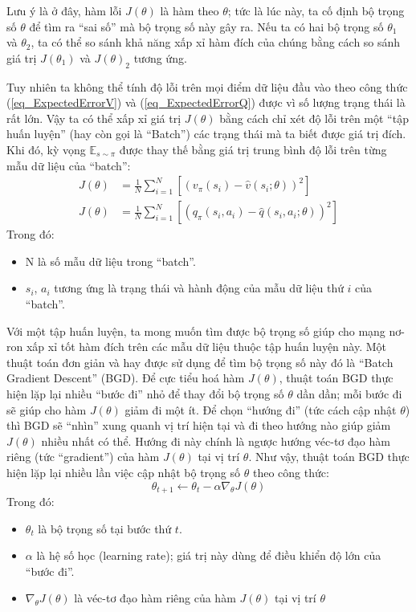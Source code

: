 	Lưu ý là ở đây, hàm lỗi $J(\theta)$ là hàm theo $\theta$; tức là lúc này, ta cố định bộ trọng số $\theta$ để tìm ra ``sai số'' mà bộ trọng số này gây ra.
	Nếu ta có hai bộ trọng số $\theta_1$ và $\theta_2$, ta có thể so sánh khả năng xấp xỉ hàm đích của chúng bằng cách so sánh giá trị $J(\theta_1)$ và $J(\theta)_2$ tương ứng.
	
	Tuy nhiên ta không thể tính độ lỗi trên mọi điểm dữ liệu đầu vào theo công thức (\ref{eq_ExpectedErrorV}) và (\ref{eq_ExpectedErrorQ}) được vì số lượng trạng thái là rất lớn.
	Vậy ta có thể xấp xỉ giá trị $J(\theta)$ bằng cách chỉ xét độ lỗi trên một ``tập huấn luyện'' (hay còn gọi là ``Batch'') các trạng thái mà ta biết được giá trị đích.
	Khi đó, kỳ vọng $\mathbb{E}_{s \sim \pi}$ được thay thế bằng giá trị trung bình độ lỗi trên từng mẫu dữ liệu của ``batch'':
	\begin{align}
		J(\theta) &= \frac{1}{N} \sum_{i = 1}^{N}[(v_{\pi}(s_{i}) - \hat{v}(s_{i};\theta))^2]\\
		\label{eq_BatchErrorV}
		J(\theta) &= \frac{1}{N} \sum_{i = 1}^{N}[(q_{\pi}(s_i,a_i) - \hat{q}(s_i,a_i;\theta))^2]
		\label{eq_BatchErrorQ}
	\end{align}
	Trong đó:
	\begin{itemize}
		\item N là số mẫu dữ liệu trong ``batch''.
		\item $s_i$, $a_i$ tương ứng là trạng thái và hành động của mẫu dữ liệu thứ $i$ của ``batch''.
	\end{itemize}
	Với một tập huấn luyện, ta mong muốn tìm được bộ trọng số giúp cho mạng nơ-ron xấp xỉ tốt hàm đích trên các mẫu dữ liệu thuộc tập huấn luyện này.
	Một thuật toán đơn giản và hay được sử dụng để tìm bộ trọng số này đó là ``Batch Gradient Descent'' (BGD).
	Để cực tiểu hoá hàm $J(\theta)$, thuật toán BGD thực hiện lặp lại nhiều ``bước đi'' nhỏ để thay đổi bộ trọng số $\theta$ dần dần; mỗi bước đi sẽ giúp cho hàm $J(\theta)$ giảm đi một ít.
	Để chọn ``hướng đi'' (tức cách cập nhật $\theta$) thì BGD sẽ ``nhìn'' xung quanh vị trí hiện tại và đi theo hướng nào giúp giảm $J(\theta)$ nhiều nhất có thể.
	Hướng đi này chính là ngược hướng véc-tơ đạo hàm riêng (tức ``gradient'') của hàm $J(\theta)$ tại vị trí $\theta$.
	Như vậy, thuật toán BGD thực hiện lặp lại nhiều lần việc cập nhật bộ trọng số $\theta$ theo công thức:
	\begin{equation}
		\theta_{t+1} \leftarrow \theta_{t} - \alpha \nabla_{\theta}J(\theta)
	\end{equation}
	Trong đó:
	\begin{itemize}
		\item $\theta_{t}$ là bộ trọng số tại bước thứ $t$.
		\item $\alpha$ là hệ số học (learning rate); giá trị này dùng để điều khiển độ lớn của ``bước đi''.
		\item $\nabla_{\theta}J(\theta)$ là véc-tơ đạo hàm riêng của hàm $J(\theta)$ tại vị trí $\theta$
	\end{itemize}
